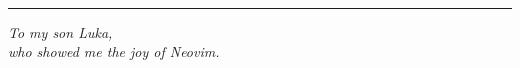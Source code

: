 \begin{titlepage}
    \raggedleft
  \begin{figure}[ht]
  \end{figure}
	\hspace{.025\textwidth}
	\parbox[b]{\textwidth}{
    \vspace{1.0cm}
		{\Huge\bfseries\Title}                \\[20pt]
		{\Large\textit\Subtitle}
  }
  \vfill
  \rule{1pt}{.14\textheight}
  \hspace{.025\textwidth}
\end{titlepage}

\newpage
\thispagestyle{empty}      %
\vspace*{\fill}             %
\begin{center}
  \Large\itshape
  To my son Luka,\\
  who showed me the joy of Neovim.
\end{center}
\vspace*{\fill}             %
\newpage                    %

